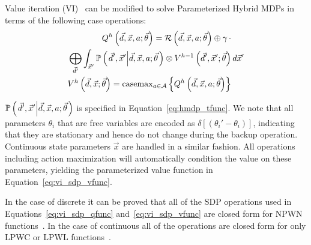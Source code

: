 Value iteration (VI)~\parencite{Bellman_PU_1957} can be modified to solve Parameterized Hybrid MDPs in terms of the following case operations:
{\footnotesize 
    \abovedisplayskip=0pt
    \belowdisplayskip=0pt
    \begin{align}
        Q^{h} \left( \vec{d}, \vec{x}, a; \vec{\theta} \right) = \mathcal{R} \left( \vec{d}, \vec{x}, a; \vec{\theta} \right) \oplus \gamma \, \cdot &  \nonumber \\ 
        \bigoplus_{\vec{d}'} \int_{\vec{x}'} \mathbb{P}\left({ \left. \vec{d}', \vec{x}' \middle| \vec{d}, \vec{x}, a; \vec{\theta} \right.}\right) \otimes V^{h-1} \left( \vec{d}', \vec{x}'; \vec{\theta} \right) & \, d\vec{x}'  \label{eq:vi_sdp_qfunc} \\
        V^{h}\left( \vec{d}, \vec{x}; \vec{\theta} \right) = \mathrm{casemax}_{a \in \mathcal{A}} \left\{ Q^{h} \left( \vec{d}, \vec{x}, a; \vec{\theta} \right) \right\} & \label{eq:vi_sdp_vfunc}
    \end{align}
}%

{\footnotesize $\mathbb{P}\left({\left. \vec{d}', \vec{x}' \middle| \vec{d}, \vec{x}, a; \vec{\theta} \right.}\right)$ } is specified in Equation~\eqref{eq:hmdp_tfunc}. We note that all parameters {\footnotesize $\theta_i$} that are free variables 
are encoded as {\footnotesize $\delta\left[\left(\theta_i' - \theta_i\right)\right]$}, indicating that they are stationary and hence do not change during the backup operation. Continuous state parameters {\footnotesize $ \vec{x} $} are handled in a similar fashion. All operations including action maximization will automatically condition the value on these parameters, yielding the parameterized value function in Equation~\eqref{eq:vi_sdp_vfunc}.

In the case of discrete {\footnotesize \Action} it can be proved that all of the SDP operations used in Equations~\eqref{eq:vi_sdp_qfunc} and~\eqref{eq:vi_sdp_vfunc} are closed form for NPWN functions~\parencite{Sanner_UAI_2011}. In the case of continuous {\footnotesize \Action} all of the operations are closed form for only LPWC or LPWL functions~\parencite{Zamani_AAAI_2012}.

